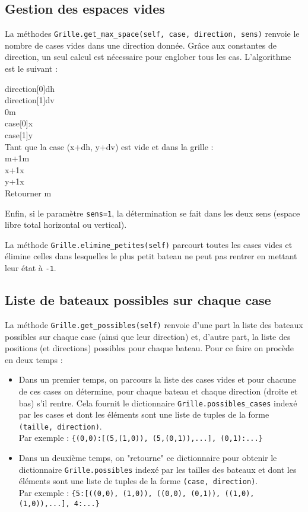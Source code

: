 \subsection{Gestion des espaces vides}
La méthodes \texttt{Grille.get\_max\_space(self, case, direction, sens)} renvoie le nombre de cases vides dans une direction donnée. Grâce aux constantes de direction, un seul calcul est nécessaire pour englober tous les cas. L'algorithme est le suivant :
\begin{algo1}
direction[0]\sto dh\\
direction[1]\sto dv\\
0\sto m\\
case[0]\sto x\\
case[1]\sto y\\
Tant que la case (x+dh, y+dv) est vide et dans la grille :\\
 m+1\sto m\\
 x+1\sto x\\
 y+1\sto x\\
Retourner m\\
\end{algo1}

Enfin, si le paramètre \texttt{sens=1}, la détermination se fait dans les deux sens (espace libre total horizontal ou vertical).

La méthode \texttt{Grille.elimine\_petites(self)} parcourt toutes les cases vides et élimine celles dans lesquelles le plus petit bateau ne peut pas rentrer en mettant leur état à \texttt{-1}.

\subsection{Liste de bateaux possibles sur chaque case}
La méthode \texttt{Grille.get\_possibles(self)} renvoie d'une part la liste des bateaux possibles sur chaque case (ainsi que leur direction) et, d'autre part, la liste des positions (et directions) possibles pour chaque bateau. Pour ce faire on procède en deux temps :
\begin{itemize}
\item Dans un premier temps, on parcours la liste des cases vides et pour chacune de ces cases on détermine, pour chaque bateau et chaque direction (droite et bas) s'il rentre. Cela fournit le dictionnaire \texttt{Grille.possibles\_cases} indexé par les cases et dont les éléments sont une liste de tuples de la forme \texttt{(taille, direction)}.\\
Par exemple : \texttt{\{(0,0):[(5,(1,0)), (5,(0,1)),...], (0,1):...\}}
\item Dans un deuxième temps, on "retourne" ce dictionnaire pour obtenir le dictionnaire \texttt{Grille.possibles} indexé par les tailles des bateaux et dont les éléments sont une liste de tuples de la forme \texttt{(case, direction)}.\\
Par exemple : \texttt{\{5:[((0,0), (1,0)), ((0,0), (0,1)), ((1,0), (1,0)),...], 4:...\}}
\end{itemize}

